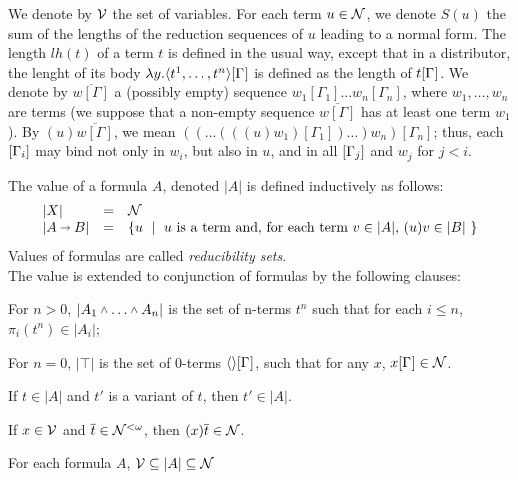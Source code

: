 \documentclass{llncs} %
\begin{document}
We denote by $\mathcal{V}$ the set of variables. 
For each term $u \in \mathcal{N}$, we denote $S(u)$ the sum of the lengths of the reduction sequences of $u$ leading to a normal form. The length $lh(t)$ of a term $t$ is defined in the usual way, except that in a distributor, the lenght of its body $\lambda y.\langle t^1,\dots, t^n \rangle\G$ is defined as the length of $t\G$.
We denote by $\overline{w[\Gamma]}$ a (possibly empty) sequence $w_1[\Gamma_1]\dots w_n[\Gamma_n]$, where $w_1,\dots ,w_n$ are terms (we suppose that a non-empty sequence  $\overline{w[\Gamma]}$ has at least one term $w_1$).
By $(u)\overline{w[\Gamma]}$, we mean $((...(((u)w_1)[\Gamma_1])\dots )w_n)[\Gamma_n]$; thus, each $\G[i]$ may bind not only in $w_i$, but also in $u$, and in all $\G[j]$ and $w_j$ for $j<i$.


\begin{definition}
The value of a formula $A$, denoted $|A|$ is defined inductively as follows:
\[
\begin{array}{lll}
|X| & = & \mathcal{N}
\\
|A\vlim B| & = & \mbox{\{$u$ \;|\;  $u$ is a term and, for each term $v\in |A|$, $(u)v \in |B|$ \}}
\end{array}
\] 
Values of formulas are called {\em reducibility sets}. \\
The value is extended to conjunction of formulas by the following clauses:

 For $n>0$, $|A_1\vlan\dots\vlan A_n|$ is the set of n-terms $t^n$ such that for each $i \leq n$, $\pi_i(t^n) \in |A_i|$;

 For $n=0$, $|\top|$ is the set of $0$-terms $\tup*{}\G$, such that for any $x$, $x\G\in\SN$.

\end{definition}


\begin{remark} 
If $t\in|A|$ and $t'$ is a variant of $t$, then $t'\in|A|$.
\end{remark}

\begin{lemma}\label{lem:HeadVar}
If $x\in \mathcal{V}$ and $\overline{t} \in \mathcal{N}^{<\omega}$, then
$(x)\overline{t} \in \mathcal{N}$.
\end{lemma}

\begin{proposition}\label{prop:IntBase}
For each formula $A$, $\mathcal{V} \subseteq |A| \subseteq  \mathcal{N}$
\end{proposition}
\end{document}
